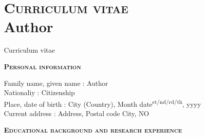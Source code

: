 
\chapter[Curriculum vitae]{\textsc{Curriculum vitae} \vspace{8pt} \\ Author}

\setcounter{page}{1}
\renewcommand{\thepage}{L-\arabic{page}}

%
{Curriculum vitae}

\regularsection
\headerregularsection


{\color{sophia} \small \bfseries {} \selectfont \scshape Personal information} \vspace{4mm}

\noindent Family name, given name \hspace{3mm} : \hspace{2.4mm} Author \\
Nationaliy \hspace{25mm} : \hspace{2.4mm} Citizenship 
\\
Place, date of birth \hspace{13mm} : \hspace{2.4mm} City (Country), Month date\textsuperscript{st/nd/rd/th}, yyyy
\\
Current address \hspace{16.7mm} : \hspace{2.4mm} Address, Postal code City, NO 


\begin{adjustwidth}{0cm}{1cm}
{\vspace{4mm} \color{sophia} \small \bfseries {} \selectfont \scshape Educational background and research experience} \vspace{4mm}
\end{adjustwidth}

